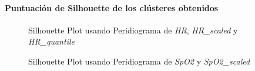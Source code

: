 \paragraph{Puntuación de Silhouette de los clústeres obtenidos}

\begin{figure}[H]
    \centering
    \caption{Silhouette Plot usando Peridiograma de \textit{HR}, \textit{HR\_scaled} y \textit{HR\_quantile}}\label{fig:per_si_fc}
\end{figure}

\begin{figure}[ht]
    \centering
    \hfill
    \caption{Silhouette Plot usando Peridiograma de \textit{SpO2} y \textit{SpO2\_scaled}}\label{fig:per_si_spo2}
\end{figure}

